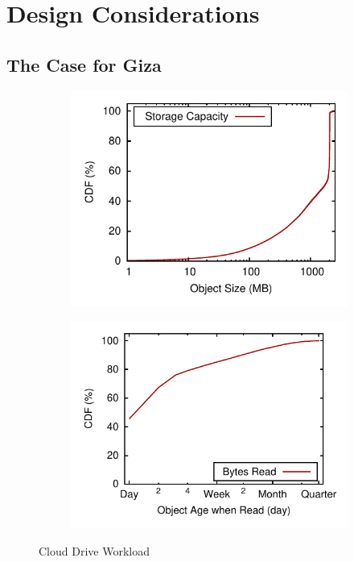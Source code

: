 \section{Design Considerations}
\label{sec:motivation}

\subsection{The Case for Giza}

\begin{figure}[tp]
\hspace{-4em}
\begin{subfigure}{.3\textwidth}
  \centering
  \includegraphics[width=\linewidth]{data/object_size-storage_capacity}
  \caption{}
  \label{fig:object_size-storage_capacity}
\end{subfigure}%
\begin{subfigure}{.3\textwidth}
  \centering
  \includegraphics[width=\linewidth]{data/write_read_gap-bytes_read}
  \caption{}
  \label{fig:write_read_gap-bytes_read}
\end{subfigure}%
\caption{Cloud Drive Workload}
\label{fig:case_for_giza}
\end{figure}

